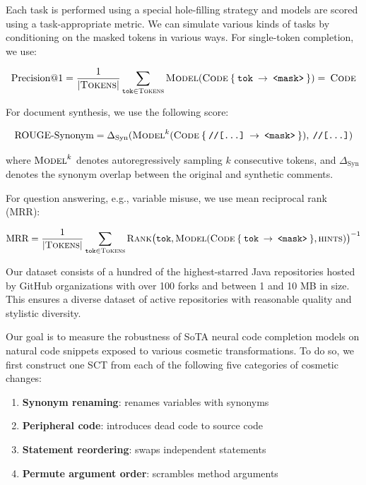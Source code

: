 \documentclass[usenames,dvipsnames]{article} %
\begin{document}
  Each task is performed using a special hole-filling strategy and models are scored using a task-appropriate metric.
  We can simulate various kinds of tasks by conditioning on the masked tokens in various ways.
  For single-token completion, we use:

\begin{equation*}
  \text{Precision@1} = \frac{1}{{|\textsc{Tokens}|}}\sum_{\texttt{tok}\in \textsc{Tokens}}\textsc{Model}(\textsc{Code}\:\{\:\texttt{tok}\:\rightarrow\:\texttt{<mask>}\:\}) = \:\textsc{Code}
\end{equation*}

  For document synthesis, we use the following score:

\begin{equation*}
\text{ROUGE-Synonym} = \Delta_{\text{Syn}}(\textsc{Model}^{k}(\textsc{Code}\:\{\:\texttt{//[...]}\:\rightarrow\:\texttt{<mask>}\:\}), \:\texttt{//[...]})
\end{equation*}

  where $\textsc{Model}^{k}$ denotes autoregressively sampling $k$ consecutive tokens, and $\Delta_\text{Syn}$ denotes the synonym overlap between the original and synthetic comments.

  For question answering, e.g., variable misuse, we use mean reciprocal rank (MRR):

\begin{equation*}
\text{MRR} = \frac{1}{|\textsc{Tokens}|} \sum_{\texttt{tok}\in\textsc{Tokens}} \textsc{Rank}\big(\texttt{tok}, \textsc{Model}(\textsc{Code}\:\{\:\texttt{tok}\:\rightarrow\:\texttt{<mask>}\:\}, \textsc{hints})\big)^{-1}
\end{equation*}

  Our dataset consists of a hundred of the highest-starred Java repositories hosted by GitHub organizations with over 100 forks and between 1 and 10 MB in size. This ensures a diverse dataset of active repositories with reasonable quality and stylistic diversity.

  Our goal is to measure the robustness of SoTA neural code completion models on natural code snippets exposed to various cosmetic transformations. To do so, we first construct one SCT from each of the following five categories of cosmetic changes:

  \begin{enumerate}[itemsep=1ex]
    \item \textbf{Synonym renaming}: renames variables with synonyms
    \item \textbf{Peripheral code}: introduces dead code to source code
    \item \textbf{Statement reordering}: swaps independent statements
    \item \textbf{Permute argument order}: scrambles method arguments
  \end{enumerate}
\end{document}
